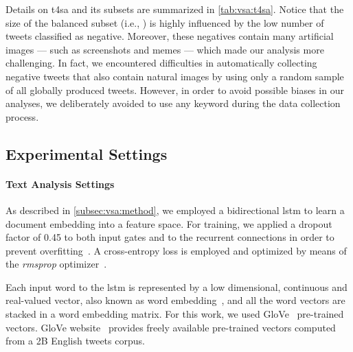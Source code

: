 Details on \gls{t4sa} and its subsets are summarized in \ref{tab:vsa:t4sa}.
Notice that the size of the balanced subset (i.e., {\BTSA}) is highly influenced by the low number of tweets classified as negative.
Moreover, these negatives contain many artificial images --- such as screenshots and memes --- which made our analysis more challenging.
In fact, we encountered difficulties in automatically collecting negative tweets that also contain natural images by using only a random sample of all globally produced tweets.
However, in order to avoid possible biases in our analyses, we deliberately avoided to use any keyword during the data collection process.

\subsection{Experimental Settings}
\label{exp:visual}

\paragraph{Text Analysis Settings}
As described in \ref{subsec:vsa:method}, we employed a bidirectional \gls{lstm} to learn a document embedding into a feature space.
For training, we applied a dropout factor of 0.45 to both input gates and to the recurrent connections in order to prevent  overfitting~\cite{gal2016theoretically}.
A cross-entropy loss is employed and optimized by means of the \emph{rmsprop} optimizer~\cite{tieleman2012lecture}.

Each input word to the \gls{lstm} is represented by a low dimensional, continuous and real-valued vector, also known as word embedding~\cite{mikolov2013distributed}, and all the word vectors are stacked in a word embedding matrix.
For this work, we used GloVe~\cite{pennington2014glove} pre-trained vectors. %
GloVe website~ provides freely available pre-trained vectors computed from a 2B English tweets corpus.

